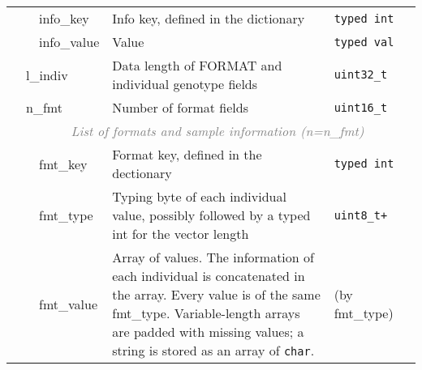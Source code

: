\documentclass[10pt]{article}
\begin{document}
\begin{table}[ht]
{\begin{tabular}{|l|l|l|p{8.2cm}|l|r|}
  & & {\sf info\_key} & Info key, defined in the dictionary & {\tt typed int} & \\\cline{3-6}
  & & {\sf info\_value} & Value & {\tt typed val} &\\\cline{2-6}
  & \multicolumn{2}{l|}{\sf l\_indiv} & Data length of {\sf FORMAT} and individual genotype fields & {\tt uint32\_t} & \\\cline{2-6}
  & \multicolumn{2}{l|}{\sf n\_fmt} & Number of format fields & {\tt uint16\_t} & \\\cline{2-6}
  & \multicolumn{5}{c|}{\textcolor{gray}{\it List of formats and sample information (n=n\_fmt)}} \\\cline{3-6}
  & & {\sf fmt\_key} & Format key, defined in the dectionary & {\tt typed int} & \\\cline{3-6}
  & & {\sf fmt\_type} & Typing byte of each individual value, possibly followed by a typed int for the vector length & {\tt uint8\_t+} & \\\cline{3-6}
  & & {\sf fmt\_value} & Array of values. The information of each individual is concatenated in the array. Every value is of the same {\sf fmt\_type}.
  	Variable-length arrays are padded with missing values; a string is stored as an array of {\tt char}. & (by {\sf fmt\_type}) &\\
  \cline{1-6}
\end{tabular}}
\end{table}
\end{document}
